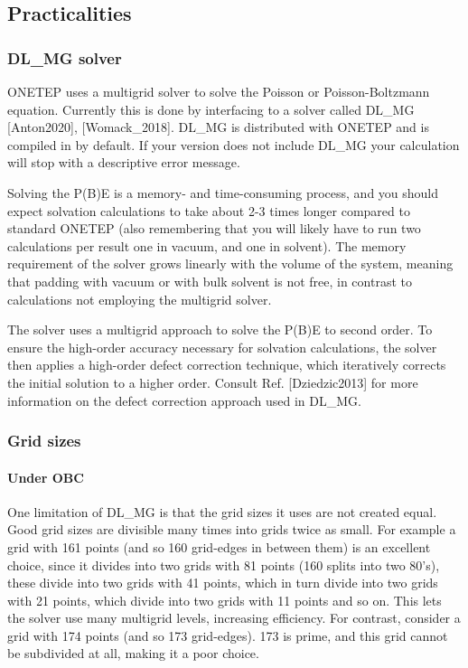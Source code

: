\documentclass[letterpaper,10pt,english]{sphinxmanual}
\begin{document}
\subsection{Practicalities}
\label{\detokenize{implicit_solvation_v3:practicalities}}

\subsubsection{DL\_MG solver}
\label{\detokenize{implicit_solvation_v3:dl-mg-solver}}
ONETEP uses a multigrid solver to solve the Poisson or Poisson-Boltzmann
equation. Currently this is done by interfacing to a solver called
DL\_MG {[}Anton2020{]}, {[}Womack\_2018{]}. DL\_MG is
distributed with ONETEP and is compiled in by default. If your version
does not include DL\_MG your calculation will stop with a descriptive
error message.

Solving the P(B)E is a memory- and time-consuming process, and you
should expect solvation calculations to take about 2-3 times longer
compared to standard ONETEP (also remembering that you will likely have
to run two calculations per result \textendash{} one in vacuum, and one in solvent).
The memory requirement of the solver grows linearly with the volume of
the system, meaning that padding with vacuum or with bulk solvent is not
free, in contrast to calculations not employing the multigrid solver.

The solver uses a multigrid approach to solve the P(B)E to second order.
To ensure the high-order accuracy necessary for solvation calculations,
the solver then applies a high-order defect correction technique, which
iteratively corrects the initial solution to a higher order. Consult
Ref. {[}Dziedzic2013{]} for more information on the defect correction approach used in
DL\_MG.


\subsubsection{Grid sizes}
\label{\detokenize{implicit_solvation_v3:grid-sizes}}

\paragraph{Under OBC}
\label{\detokenize{implicit_solvation_v3:under-obc}}
One limitation of DL\_MG is that the grid sizes it uses are not created
equal. Good grid sizes are divisible many times into grids twice as
small. For example a grid with 161 points (and so 160 grid-edges in
between them) is an excellent choice, since it divides into two grids
with 81 points (160 splits into two 80’s), these divide into two grids
with 41 points, which in turn divide into two grids with 21 points,
which divide into two grids with 11 points and so on. This lets the
solver use many multigrid levels, increasing efficiency. For contrast,
consider a grid with 174 points (and so 173 grid-edges). 173 is prime,
and this grid cannot be subdivided at all, making it a poor choice.
\end{document}
